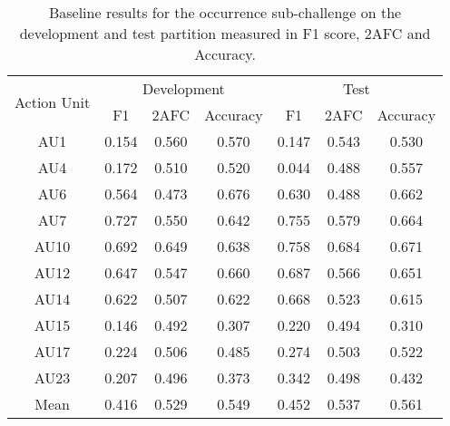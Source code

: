 \documentclass[a4paper, 10pt, conference]{ieeeconf}      \usepackage{FG2017}
\begin{document}
\begin{table*}[t]
\begin{center}
\caption{Baseline results for the occurrence sub-challenge on the development and test partition measured in F1 score, 2AFC and Accuracy.}
\vspace{2mm}
\label{t:baseline_occurrence_results}
\begin{tabular}{c|c|c|c|c|c|c}
\hline
\multirow{2}{*}{Action Unit} & \multicolumn{3}{c|}{Development} & \multicolumn{3}{c}{Test} \\
\hhline{~------}
& F1 & 2AFC & Accuracy & F1 & 2AFC & Accuracy \\
\hline
AU1 & 0.154 & 0.560 & 0.570 & 0.147 & 0.543 & 0.530 \\  
AU4 & 0.172 & 0.510 & 0.520 & 0.044 & 0.488 & 0.557 \\ 
AU6 & 0.564 & 0.473 & 0.676 & 0.630 & 0.488 & 0.662 \\
AU7 & 0.727 & 0.550 & 0.642 & 0.755 & 0.579 & 0.664 \\  
AU10 & 0.692 & 0.649 & 0.638 & 0.758 & 0.684 & 0.671 \\ 
AU12 & 0.647 & 0.547 & 0.660 & 0.687 & 0.566 & 0.651 \\  
AU14 & 0.622 & 0.507 & 0.622 & 0.668 & 0.523 & 0.615 \\ 
AU15 & 0.146 & 0.492 & 0.307 & 0.220 & 0.494 & 0.310 \\ 
AU17 & 0.224 & 0.506 & 0.485 & 0.274 & 0.503 & 0.522 \\
AU23 & 0.207 & 0.496 & 0.373 & 0.342 & 0.498 & 0.432 \\ 
\hline
Mean & 0.416 & 0.529 & 0.549 & 0.452 & 0.537 & 0.561 \\
\hline
\end{tabular}
\end{center}
\end{table*}
 

    
\end{document}
